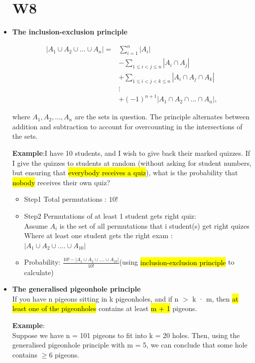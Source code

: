 \documentclass{article}
\begin{document}
\begin{itemize}
\section{W8}

\item \textbf{The inclusion-exclusion principle}

\[
\begin{aligned}
\left| A_1 \cup A_2 \cup \ldots \cup A_n \right| = & \sum_{i=1}^{n} \left| A_i \right| \\
& - \sum_{1 \leq i < j \leq n} \left| A_i \cap A_j \right| \\
& + \sum_{1 \leq i < j < k \leq n} \left| A_i \cap A_j \cap A_k \right| \\
& \vdots \\
& + (-1)^{n+1} \left| A_1 \cap A_2 \cap \ldots \cap A_n \right|,
\end{aligned}
\]

where \( A_1, A_2, \ldots, A_n \) are the sets in question. The principle alternates between addition and subtraction to account for overcounting in the intersections of the sets.

\textbf{Example}:I have 10 students, and I wish to give back their marked quizzes.
If I give the quizzes to students at random (without asking for student
numbers, but ensuring that \hl{everybody receives a quiz}),
what is the probability that \hl{nobody} receives their own quiz?

\begin{itemize}
\item{Step1} Total permutations : $10!$
\item{Step2} Permutations of at least 1 student gets right quiz:\\
Assume $A_i$ is the set of all permutations that i student(s) get right quizes
Where at least one student gets the right exam :  \\$| A_1 \cup A_2 \cup ....  \cup A_{10}|$
\item Probability: $\frac{10! - | A_1 \cup A_2 \cup ....  \cup A_{10}|} {10!}$(using \hl{ inclusion-exclusion principle} to calculate)
\end{itemize}

\item \textbf{The generalised pigeonhole principle}\\
If you have n pigeons sitting in k pigeonholes, and if n $>$ k · m, then\hl{ at
least one of the pigeonholes} contains at least \hl{m + 1} pigeons.

\textbf{Example}:\\
Suppose we have n = 101 pigeons to fit into k = 20 holes.
Then, using the generalised pigeonhole principle with m = 5, we can
conclude that some hole contains $\geq 6$ pigeons.



\end{itemize}
\end{document}
